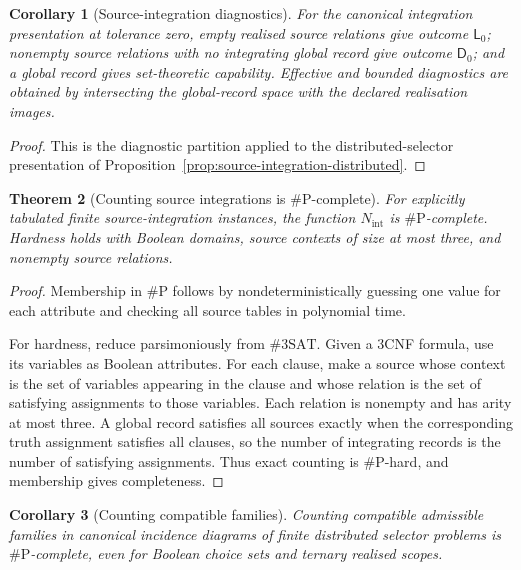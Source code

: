 \documentclass[11pt]{article}
\theoremstyle{plain}
\newtheorem{theorem}{Theorem}[section]
\newtheorem{corollary}[theorem]{Corollary}
\theoremstyle{definition}
\theoremstyle{remark}
\begin{document}
\begin{corollary}[Source-integration diagnostics]
\label{cor:source-integration-diagnostics}
For the canonical integration presentation at tolerance zero, empty realised
source relations give outcome $\mathsf L_0$; nonempty source relations with no
integrating global record give outcome $\mathsf D_0$; and a global record gives
set-theoretic capability. Effective and bounded diagnostics are obtained by
intersecting the global-record space with the declared realisation images.
\end{corollary}

\begin{proof}
This is the diagnostic partition applied to the distributed-selector
presentation of Proposition~\ref{prop:source-integration-distributed}.
\end{proof}

\begin{theorem}[Counting source integrations is $\#\mathrm P$-complete]
\label{thm:source-integration-sharpP}
For explicitly tabulated finite source-integration instances, the function
$N_{\mathrm{int}}$ is $\#\mathrm P$-complete. Hardness holds with Boolean
domains, source contexts of size at most three, and nonempty source relations.
\end{theorem}

\begin{proof}
Membership in $\#\mathrm P$ follows by nondeterministically guessing one value
for each attribute and checking all source tables in polynomial time.

For hardness, reduce parsimoniously from $\#3\mathrm{SAT}$. Given a 3CNF formula,
use its variables as Boolean attributes. For each clause, make a source whose
context is the set of variables appearing in the clause and whose relation is
the set of satisfying assignments to those variables. Each relation is nonempty
and has arity at most three. A global record satisfies all sources exactly when
the corresponding truth assignment satisfies all clauses, so the number of
integrating records is the number of satisfying assignments. Thus exact counting
is $\#\mathrm P$-hard, and membership gives completeness.
\end{proof}

\begin{corollary}[Counting compatible families]
\label{cor:counting-compatible-families}
Counting compatible admissible families in canonical incidence diagrams of
finite distributed selector problems is $\#\mathrm P$-complete, even for Boolean
choice sets and ternary realised scopes.
\end{corollary}
\end{document}
